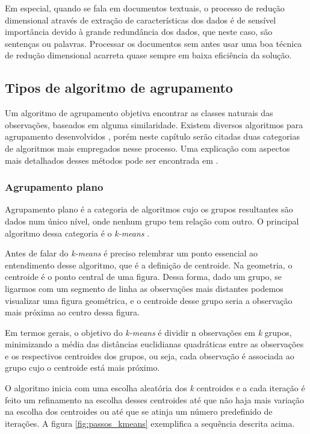 \documentclass[a4paper,12pt]{article}
\begin{document}
Em especial, quando se fala em documentos textuais, o processo de redução dimensional através de extração de características dos dados é de sensível importância devido à grande redundância dos dados, que neste caso, são sentenças ou palavras. Processar os documentos sem antes usar uma boa técnica de redução dimensional acarreta quase sempre em baixa eficiência da solução.

\subsection{Tipos de algoritmo de agrupamento}
\label{sec:tipos_algoritmo_agrupamento}

Um algoritmo de agrupamento objetiva encontrar as classes naturais das observações, baseados em alguma similaridade. Existem diversos algoritmos para agrupamento desenvolvidos \cite{Koutroumbas06, Jain99}, porém neste capítulo serão citadas duas categorias de algoritmos mais empregados nesse processo. Uma explicação com aspectos mais detalhados desses métodos pode ser encontrada em \cite{Koutroumbas06, Jain99}.

\subsubsection{Agrupamento plano}
\label{sec:agrupamento_plano}

Agrupamento plano é a categoria de algoritmos cujo os grupos resultantes são dados num único nível, onde nenhum grupo tem relação com outro. O principal algoritmo dessa categoria é o \textit{k-means} \cite{Manning09}.

Antes de falar do \textit{k-means} é preciso relembrar um ponto essencial ao entendimento desse algoritmo, que é a definição de centroide. Na geometria, o centroide é o ponto central de uma figura. Dessa forma, dado um grupo, se ligarmos com um segmento de linha as observações mais distantes podemos visualizar uma figura geométrica, e o centroide desse grupo seria a observação mais próxima ao centro dessa figura.


Em termos gerais, o objetivo do \textit{k-means} é dividir n observações em \textit{k} grupos, minimizando a média das distâncias euclidianas quadráticas entre as observações e os respectivos centroides dos grupos, ou seja, cada observação é associada ao grupo cujo o centroide está mais próximo. 

O algoritmo inicia com uma escolha aleatória dos \textit{k} centroides e a cada iteração é feito um refinamento na escolha desses centroides até que não haja mais variação na escolha dos centroides ou até que se atinja um número predefinido de iterações. A figura \ref{fig:passos_kmeans} exemplifica a sequência descrita acima.
\end{document}
